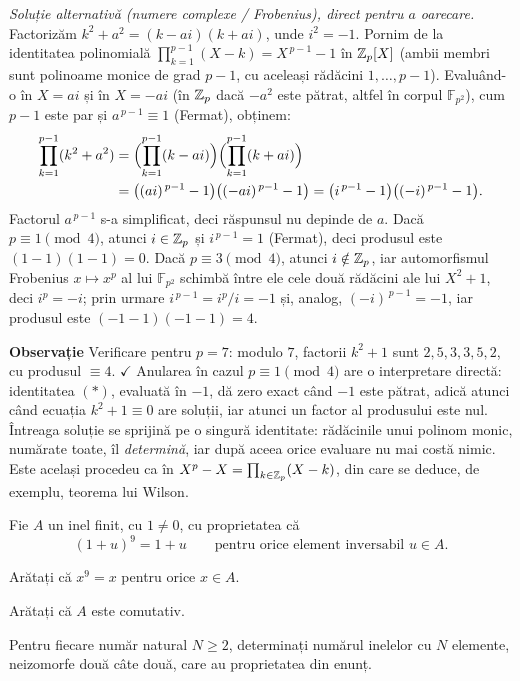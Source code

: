 \begin{solutie}
\emph{Soluție alternativă (numere complexe / Frobenius), direct pentru $a$ oarecare.} Factorizăm $k^2 + a^2 = (k - ai)(k + ai)$, unde $i^2 = -1$. Pornim de la identitatea polinomială $\prod_{k=1}^{p-1}(X-k) = X^{\,p-1}-1$ în $\mathbb{Z}_p[X]$ (ambii membri sunt polinoame monice de grad $p-1$, cu aceleași rădăcini $1,\dots,p-1$). Evaluând-o în $X = ai$ și în $X = -ai$ (în $\mathbb{Z}_p$ dacă $-a^2$ este pătrat, altfel în corpul $\mathbb{F}_{p^2}$), cum $p-1$ este par și $a^{\,p-1} \equiv 1$ (Fermat), obținem:
\[
  \begin{aligned}
    \prod_{k=1}^{p-1}(k^2+a^2)
    &= \Bigl( \prod_{k=1}^{p-1} (k - ai) \Bigr) \Bigl( \prod_{k=1}^{p-1} (k + ai) \Bigr) \\
    &= \bigl( (ai)^{\,p-1} - 1 \bigr) \bigl( (-ai)^{\,p-1} - 1 \bigr)
     = \bigl( i^{\,p-1} - 1 \bigr) \bigl( (-i)^{\,p-1} - 1 \bigr) .
  \end{aligned}
\]
Factorul $a^{\,p-1}$ s-a simplificat, deci răspunsul nu depinde de $a$. Dacă $p \equiv 1 \pmod 4$, atunci $i \in \mathbb{Z}_p$ și $i^{\,p-1} = 1$ (Fermat), deci produsul este $(1-1)(1-1) = 0$. Dacă $p \equiv 3 \pmod 4$, atunci $i \notin \mathbb{Z}_p$, iar automorfismul Frobenius $x \mapsto x^p$ al lui $\mathbb{F}_{p^2}$ schimbă între ele cele două rădăcini ale lui $X^2+1$, deci $i^p = -i$; prin urmare $i^{\,p-1} = i^p/i = -1$ și, analog, $(-i)^{\,p-1} = -1$, iar produsul este $(-1-1)(-1-1) = 4$.

\medskip
\noindent\textbf{Observație} Verificare pentru $p = 7$: modulo $7$, factorii $k^2+1$ sunt $2,5,3,3,5,2$, cu produsul $\equiv 4$. $\checkmark$ \quad Anularea în cazul $p \equiv 1 \pmod 4$ are o interpretare directă: identitatea $(*)$, evaluată în $-1$, dă zero exact când $-1$ este pătrat, adică atunci când ecuația $k^2+1 \equiv 0$ are soluții, iar atunci un factor al produsului este nul. Întreaga soluție se sprijină pe o singură identitate: rădăcinile unui polinom monic, numărate toate, îl \emph{determină}, iar după aceea orice evaluare nu mai costă nimic. Este același procedeu ca în $X^p - X = \prod_{k \in \mathbb{Z}_p}(X - k)$, din care se deduce, de exemplu, teorema lui Wilson.
\end{solutie}

\begin{problema}
Fie $A$ un inel finit, cu $1\neq 0$, cu proprietatea că
\[
  (1+u)^{9}=1+u\qquad\text{pentru orice element inversabil } u\in A .
\]
\begin{parti}
\item Arătați că $x^{9}=x$ pentru orice $x\in A$.
\item Arătați că $A$ este comutativ.
\item Pentru fiecare număr natural $N\ge 2$, determinați numărul inelelor cu $N$ elemente, neizomorfe două câte două, care au proprietatea din enunț.
\end{parti}
\end{problema}

